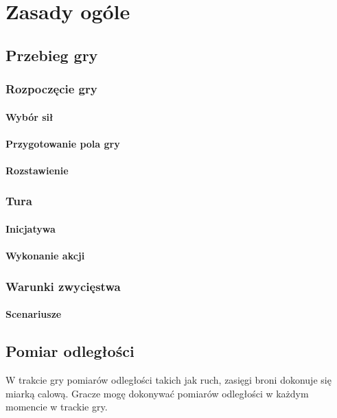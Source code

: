 \chapter{Zasady ogóle}

\section{Przebieg gry}

\subsection{Rozpoczęcie gry}

\subsubsection{Wybór sił}

\subsubsection{Przygotowanie pola gry}

\subsubsection{Rozstawienie}

\subsection{Tura}

\subsubsection{Inicjatywa}

\subsubsection{Wykonanie akcji}

\subsection{Warunki zwycięstwa}

\subsubsection{Scenariusze}

\section{Pomiar odległości}
W trakcie gry pomiarów odległości takich jak ruch, zasięgi broni dokonuje się miarką calową. Gracze mogę dokonywać pomiarów odległości w każdym momencie w trackie gry. 

